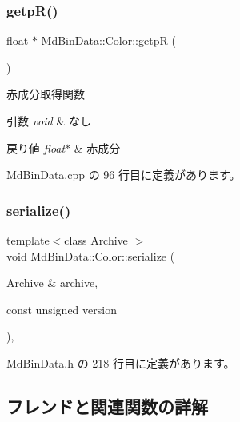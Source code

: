 \subsubsection{\texorpdfstring{getp\+R()}{getpR()}}
{\footnotesize\ttfamily float $\ast$ Md\+Bin\+Data\+::\+Color\+::getpR (\begin{DoxyParamCaption}{ }\end{DoxyParamCaption})}



赤成分取得関数 


\begin{DoxyParams}{引数}
{\em void} & なし \\
\hline
\end{DoxyParams}

\begin{DoxyRetVals}{戻り値}
{\em float$\ast$} & 赤成分 \\
\hline
\end{DoxyRetVals}


 Md\+Bin\+Data.\+cpp の 96 行目に定義があります。

\mbox{\label{class_md_bin_data_1_1_color_a7442aa5a639d3324010bb56f6db2a5fc}} 
\subsubsection{\texorpdfstring{serialize()}{serialize()}}
{\footnotesize\ttfamily template$<$class Archive $>$ \\
void Md\+Bin\+Data\+::\+Color\+::serialize (\begin{DoxyParamCaption}\item[{Archive \&}]{archive,  }\item[{const unsigned}]{version }\end{DoxyParamCaption})\hspace{0.3cm}{\ttfamily [inline]}, {\ttfamily [private]}}



 Md\+Bin\+Data.\+h の 218 行目に定義があります。



\subsection{フレンドと関連関数の詳解}
\mbox{\label{class_md_bin_data_1_1_color_ac98d07dd8f7b70e16ccb9a01abf56b9c}} 
